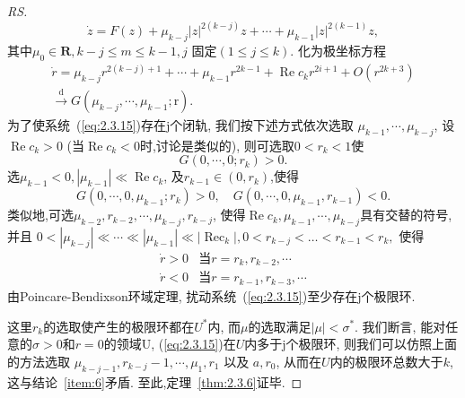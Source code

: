\begin{proof}[RS]
\begin{equation}
  \label{eq:2.3.15}
\dot{z}=F(z)+\mu_{k-j}|z|^{2(k-j)} z+\cdots+\mu_{k-1}|z|^{2(k-1)} z,
\end{equation}
其中$\mu_{0} \in \mathbf{R}, k-j \leqslant m \leqslant k-1, j$
固定$(1 \leqslant j \leqslant k)$.
化为极坐标方程
\begin{align}
  \dot{r}=\mu_{k-j} r^{2(k-j)+1}+\cdots+\mu_{k-1} r^{2 k-1}+\operatorname{Re} c_{k} r^{2 i+1}+O\left(r^{2 k+3}\right)\\
  \stackrel{\mathrm{d}}{\longrightarrow} G\left(\mu_{k-j}, \cdots, \mu_{k-1} ; \mathrm{r}\right).
\end{align}
为了使系统~(\ref{eq:2.3.15})存在j个闭轨,
我们按下述方式依次选取
$\mu_{k-1}, \cdots, \mu_{k-j}$,
设$\operatorname{Re} c_{k}>0$
(当$\operatorname{Re} c_{k}<0$时,讨论是类似的),
则可选取$0<r_{k}<1$使
$$ G\left(0, \cdots, 0 ; r_{k}\right)>0 .$$
选$\mu_{k-1}<0,\left|\mu_{k-1}\right| \ll \operatorname{Re} c_{k}$,
及$r_{k-1} \in\left(0, r_{k}\right)$,使得
$$
G\left(0, \cdots, 0, \mu_{k-1} ; r_{k}\right)>0, \quad G\left(0, \cdots, 0, \mu_{k-1}, r_{k-1}\right)<0.
$$
类似地,可选$\mu_{k-2}, r_{k-2}, \cdots, \mu_{k-j}, r_{k-j}$,
使得$\operatorname{Re} c_{k}, \mu_{k-1}, \cdots, \mu_{k-j}$具有交替的符号,
并且
$0<\left|\mu_{k-j}\right| \ll \cdots \ll\left|\mu_{k-1}\right| \ll\left|\operatorname{Rec}_{k}\right|, 0<r_{k-j}<\dots<r_{k-1}<r_{k},$
使得
\begin{equation*}
  \begin{aligned}
    {\dot{r}>0} & \text{当}r=r_{k}, r_{k-2}, \cdots \\
    {\dot{r}<0} & \text{当}r=r_{k-1}, r_{k-3}, \cdots
  \end{aligned}
\end{equation*}
由Poincare-Bendixson环域定理,
扰动系统~(\ref{eq:2.3.15})至少存在j个极限环.
\par
这里$r_k$的选取使产生的极限环都在$U^{*}$内,
而$\mu$的选取满足$|\mu|<\sigma^{*}$.
我们断言,
能对任意的$\sigma>0$和$r=0$的领域U,
(\ref{eq:2.3.15})在$U$内多于j个极限环,
则我们可以仿照上面的方法选取
$\mu_{k-j-1},r_{k-j}-1, \cdots, \mu_{1}, r_{1}$
以及
$a,r_{0}$,
从而在$U$内的极限环总数大于$k$,这与结论~\ref{item:6}矛盾.
至此,定理~\ref{thm:2.3.6}证毕.
\end{proof}

